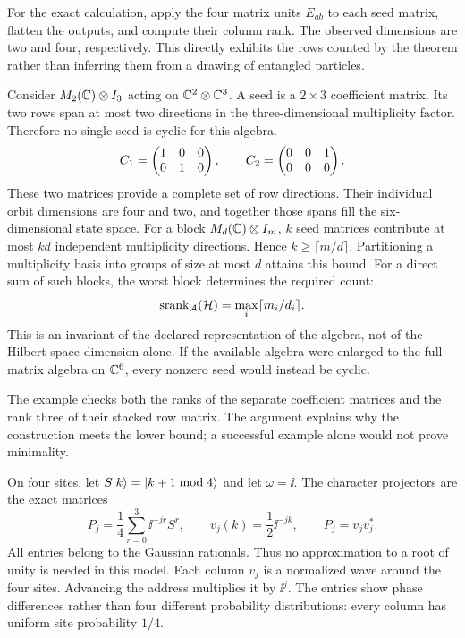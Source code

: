 For the exact calculation, apply the four matrix units $E_{ab}$ to each seed matrix, flatten the outputs, and compute their column rank. The observed dimensions are two and four, respectively. This directly exhibits the rows counted by the theorem rather than inferring them from a drawing of entangled particles.

Consider $M_2(\CC)\otimes I_3$ acting on $\CC^2\otimes\CC^3$. A seed is a $2\times3$ coefficient matrix. Its two rows span at most two directions in the three-dimensional multiplicity factor. Therefore no single seed is cyclic for this algebra.
\[
C_1=\begin{pmatrix}1&0&0\\0&1&0\end{pmatrix},\qquad
C_2=\begin{pmatrix}0&0&1\\0&0&0\end{pmatrix}.
\]
These two matrices provide a complete set of row directions. Their individual orbit dimensions are four and two, and together those spans fill the six-dimensional state space.
For a block $M_d(\CC)\otimes I_m$, $k$ seed matrices contribute at most $kd$ independent multiplicity directions. Hence $k\ge\lceil m/d\rceil$. Partitioning a multiplicity basis into groups of size at most $d$ attains this bound. For a direct sum of such blocks, the worst block determines the required count:
\[
\operatorname{srank}_{\AA}(\HH)=\max_i\lceil m_i/d_i\rceil.
\]
This is an invariant of the declared representation of the algebra, not of the Hilbert-space dimension alone. If the available algebra were enlarged to the full matrix algebra on $\CC^6$, every nonzero seed would instead be cyclic.

The example checks both the ranks of the separate coefficient matrices and the rank three of their stacked row matrix. The argument explains why the construction meets the lower bound; a successful example alone would not prove minimality.

On four sites, let $S\lvert k\rangle=\lvert k+1\bmod4\rangle$ and let $\omega=\ii$. The character projectors are the exact matrices
\[
P_j=\frac14\sum_{r=0}^3\ii^{-jr}S^r,
\qquad v_j(k)=\frac12\ii^{-jk},\qquad P_j=v_jv_j^*.
\]
All entries belong to the Gaussian rationals. Thus no approximation to a root of unity is needed in this model.
Each column $v_j$ is a normalized wave around the four sites. Advancing the address multiplies it by $\ii^j$. The entries show phase differences rather than four different probability distributions: every column has uniform site probability $1/4$.

